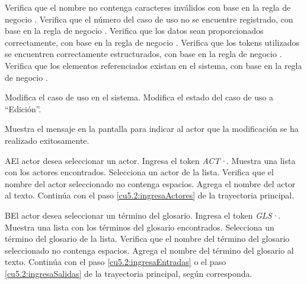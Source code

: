 \begin{UCtrayectoria}
    \UCpaso[\UCsist] Verifica que el nombre no contenga caracteres inválidos con base en la regla de negocio . 
	\UCpaso[\UCsist] Verifica que el número del caso de uso no se encuentre registrado, con base en la regla de negocio  . 
	    \UCpaso[\UCsist] Verifica que los datos sean proporcionados correctamente, con base en la regla de negocio .  
    \UCpaso[\UCsist] Verifica que los tokens utilizados se encuentren correctamente estructurados, con base en la regla de negocio . 
    \UCpaso[\UCsist] Verifica que los elementos referenciados existan en el sistema, con base en la regla de negocio . 
    
    \UCpaso[\UCsist] Modifica el caso de uso en el sistema.
    \UCpaso[\UCsist] Modifica el estado del caso de uso a ``Edición''.
	
    \UCpaso[\UCsist] Muestra el mensaje  en la pantalla  
    para indicar al actor que la modificación se ha realizado exitosamente.
 \end{UCtrayectoria}
 
 \begin{UCtrayectoriaA}{A}{El actor desea seleccionar un actor.}
 	\UCpaso[\UCactor] Ingresa el token {\it ACT·}.
 	\UCpaso[\UCsist] Muestra una lista con los actores encontrados.
 	\UCpaso[\UCactor] Selecciona un actor de la lista.
  	\UCpaso[\UCsist] Verifica que el nombre del actor seleccionado no contenga espacios. 
  	\UCpaso[\UCsist] Agrega el nombre del actor al texto.
    \UCpaso[] Continúa con el paso \ref{cu5.2:ingresaActores} de la trayectoria principal.
 \end{UCtrayectoriaA}
 \begin{UCtrayectoriaA}{B}{El actor desea seleccionar un término del glosario.}
 	\UCpaso[\UCactor] Ingresa el token {\it GLS·}.	
 	\UCpaso[\UCsist] Muestra una lista con los términos del glosario encontrados.
 	\UCpaso[\UCactor] Selecciona un término del glosario de la lista.
  	\UCpaso[\UCsist] Verifica que el nombre del término del glosario seleccionado no contenga espacios. 
  	\UCpaso[\UCsist] Agrega el nombre del término del glosario al texto.
    \UCpaso[] Continúa con el paso \ref{cu5.2:ingresaEntradas} o el paso \ref{cu5.2:ingresaSalidas} de la trayectoria principal, según corresponda.
 \end{UCtrayectoriaA}

